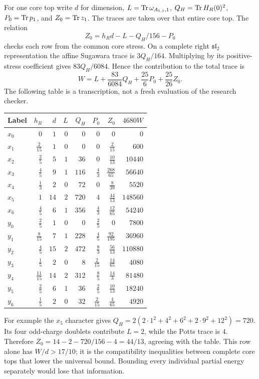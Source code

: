 For one core top write $d$ for dimension,
$L=\operatorname{Tr}\omega_{A_{1,1},1}$, $Q_H=\operatorname{Tr} H_R(0)^2$,
$P_0=\operatorname{Tr} p_1$, and $Z_0=\operatorname{Tr} z_1$. The traces are taken over
that entire core top. The relation
\[
 Z_0=h_Rd-L-Q_H/156-P_0
\]
checks each row from the common core stress. On a complete right
$\mathfrak{sl}_2$ representation the affine Sugawara trace is
$3Q_H/164$. Multiplying by its positive-stress coefficient gives
$83Q_H/6084$. Hence the contribution to the total trace is
\[
 W=L+\frac{83}{6084}Q_H+\frac{25}{6}P_0+\frac{25}{26}Z_0.
\]
The following table is a transcription, not a fresh evaluation of
the research checker.

\begin{longtable}{@{}lrrrrrrr@{}}
\toprule
Label&$h_R$&$d$&$L$&$Q_H$&$P_0$&$Z_0$&$4680W$\\
\midrule\endhead
$x_0$&$0$&$1$&$0$&$0$&$0$&$0$&$0$\\[3pt]
$x_1$&$\frac{2}{15}$&$1$&$0$&$0$&$0$&$\frac{2}{15}$&$600$\\[3pt]
$x_2$&$\frac{2}{5}$&$5$&$1$&$36$&$0$&$\frac{10}{13}$&$10440$\\[3pt]
$x_3$&$\frac{4}{5}$&$9$&$1$&$116$&$\frac{4}{3}$&$\frac{268}{65}$&$56640$\\[3pt]
$x_4$&$\frac{1}{3}$&$2$&$0$&$72$&$0$&$\frac{8}{39}$&$5520$\\[3pt]
$x_5$&$1$&$14$&$2$&$720$&$4$&$\frac{44}{13}$&$148560$\\[3pt]
$x_6$&$\frac{4}{5}$&$6$&$1$&$356$&$\frac{4}{3}$&$\frac{12}{65}$&$54240$\\[3pt]
$y_0$&$\frac{2}{5}$&$1$&$0$&$0$&$\frac{2}{5}$&$0$&$7800$\\[3pt]
$y_1$&$\frac{8}{15}$&$7$&$1$&$228$&$\frac{4}{5}$&$\frac{92}{195}$&$36960$\\[3pt]
$y_2$&$\frac{4}{5}$&$15$&$2$&$472$&$\frac{8}{3}$&$\frac{56}{13}$&$110880$\\[3pt]
$y_3$&$\frac{1}{5}$&$2$&$0$&$8$&$\frac{2}{15}$&$\frac{14}{65}$&$4080$\\[3pt]
$y_4$&$\frac{11}{15}$&$14$&$2$&$312$&$\frac{8}{5}$&$\frac{14}{3}$&$81480$\\[3pt]
$y_5$&$\frac{2}{5}$&$6$&$1$&$36$&$\frac{2}{5}$&$\frac{10}{13}$&$18240$\\[3pt]
$y_6$&$\frac{1}{5}$&$2$&$0$&$32$&$\frac{2}{15}$&$\frac{4}{65}$&$4920$\\[3pt]
\bottomrule
\end{longtable}

For example the $x_5$ character gives
$Q_H=2(2\cdot1^2+4^2+6^2+2\cdot9^2+12^2)=720$.
Its four odd-charge doublets contribute $L=2$, while the Potts
trace is $4$. Therefore
$Z_0=14-2-720/156-4=44/13$, agreeing with the table.
This row alone has $W/d>17/10$; it is the compatibility
inequalities between complete core tops that lower the universal
bound. Bounding every individual partial energy separately would
lose that information.


